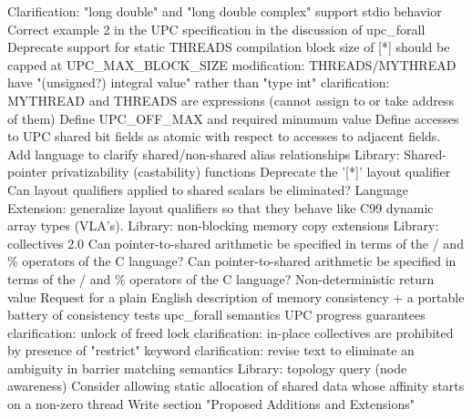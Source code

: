 {      \or %
        Clarification: "long double" and "long double complex" support
      \or %
        stdio behavior
      \or %
        Correct example 2 in the UPC specification in the discussion of upc\_forall
      \or %
        Deprecate support for static THREADS compilation
      \or %
        block size of [*] should be capped at UPC\_MAX\_BLOCK\_SIZE
      \or %
        modification: THREADS/MYTHREAD have "(unsigned?) integral value" rather than "type int"
      \or %
        clarification: MYTHREAD and THREADS are expressions (cannot assign to or take address of them)
      \or %
        Define UPC\_OFF\_MAX and required minumum value
      \or %
        Define accesses to UPC shared bit fields as atomic with respect to accesses to adjacent fields.
      \or %
        Add language to clarify shared/non-shared alias relationships
      \or %
        Library: Shared-pointer privatizability (castability) functions
      \or %
        Deprecate the '[*]' layout qualifier
      \or %
        Can layout qualifiers applied to shared scalars be eliminated?
      \or %
        Language Extension:  generalize layout qualifiers so that they behave like C99 dynamic array types (VLA's).
      \or %
        Library: non-blocking memory copy extensions
      \or %
        Library: collectives 2.0
      \or %
        Can pointer-to-shared arithmetic be specified in terms of the / and \% operators of the C language?
      \or %
        Can pointer-to-shared arithmetic be specified in terms of the / and \% operators of the C language?
      \or %
        Non-deterministic return value
      \or %
        Request for a plain English description of memory consistency + a portable battery of consistency tests
      \or %
        upc\_forall semantics
      \or %
        UPC progress guarantees
      \or %
        clarification: unlock of freed lock
      \or %
        clarification: in-place collectives are prohibited by presence of "restrict" keyword
      \or %
        clarification: revise text to eliminate an ambiguity in barrier matching semantics
      \or %
        Library: topology query (node awareness)
      \or %
        Consider allowing static allocation of shared data whose affinity starts on a non-zero thread
      \or %
        Write section "Proposed Additions and Extensions"
}
